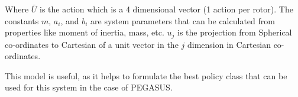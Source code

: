 \documentclass[BTech]{iitmdiss}
\begin{document}
Where $\bar{U}$ is the action which is a 4 dimensional vector (1 action per rotor). The constants $m$, $a_{i}$, and $b_{i}$ are system parameters that can be calculated from properties like moment of inertia, mass, etc. $u_{j}$ is the projection from Spherical co-ordinates to Cartesian of a unit vector in the $j$ dimension in Cartesian co-ordinates.

This model is useful, as it helps to formulate the best policy class that can be used for this system in the case of PEGASUS.


\begin{singlespace}
  
\end{singlespace}
\end{document}
